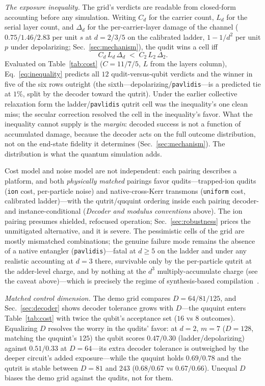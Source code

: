 \documentclass[aps,pra,reprint,superscriptaddress,nofootinbib,floatfix]{revtex4-2}
\begin{document}
\emph{The exposure inequality.} The grid's verdicts are readable from
closed-form accounting before any simulation. Writing $C_d$ for the
carrier count, $L_d$ for the serial layer count, and $\Delta_d$ for
the per-carrier-layer damage of the channel ($0.75/1.46/2.83$ per unit
$s$ at $d=2/3/5$ on the calibrated ladder, $1-1/d^2$ per unit $p$
under depolarizing; Sec.~\ref{sec:mechanism}), the qudit wins a cell
iff
\begin{equation}
C_d\,L_d\,\Delta_d \;<\; C_2\,L_2\,\Delta_2 .
\label{eq:inequality}
\end{equation}
Evaluated on Table~\ref{tab:cost} ($C=11/7/5$, $L$ from the layers
column), Eq.~\eqref{eq:inequality} predicts all $12$
qudit-versus-qubit verdicts and the winner in five of the six rows
outright (the sixth---depolarizing/\texttt{pavlidis}---is a predicted
tie at $1\%$, split by the decoder toward the qutrit). Under the
earlier collective relaxation form the ladder/\texttt{pavlidis}
qutrit cell was the inequality's one clean miss; the secular
correction resolved the cell in the inequality's favor. What the inequality cannot
supply is the \emph{margin}: decoded success is not a function of
accumulated damage, because the decoder acts on the full outcome
distribution, not on the end-state fidelity it determines
(Sec.~\ref{sec:mechanism}). The distribution is what the quantum
simulation adds.

Cost model and noise model are not independent: each pairing describes a
platform, and both \emph{physically matched} pairings favor
qudits---trapped-ion qudits (\texttt{ion} cost, per-particle noise)
and native-cross-Kerr transmons (\texttt{uniform} cost, calibrated
ladder)---with the qutrit/ququint ordering inside each pairing
decoder- and instance-conditional (\emph{Decoder and modulus
conventions} above). The ion pairing presumes shielded, refocused operation;
Sec.~\ref{sec:robustness} prices the unmitigated alternative, and it
is severe. The pessimistic cells of the grid are mostly mismatched
combinations; the genuine failure mode remains the absence of a native
entangler (\texttt{pavlidis})---fatal at $d\ge5$ on the ladder and
under any realistic accounting at $d=3$ there, survivable only by the
per-particle qutrit at the adder-level charge, and by nothing at the
$d^3$ multiply-accumulate charge (see the caveat above)---which is
precisely the regime of
synthesis-based compilation~\cite{gustafson2025synthesis,venturelli2025}.

\emph{Matched control dimension.} The demo grid compares
$D=64/81/125$, and Sec.~\ref{sec:decoder} shows decoder tolerance
grows with $D$---the ququint enters Table~\ref{tab:cost} with twice
the qubit's acceptance set ($16$ vs $8$ outcomes). Equalizing $D$
resolves the worry in the qudits' favor: at $d=2$, $m=7$ ($D=128$,
matching the ququint's $125$) the qubit scores $0.47/0.30$
(ladder/depolarizing) against $0.51/0.33$ at $D=64$---its extra
decoder tolerance is outweighed by the deeper circuit's added
exposure---while the ququint holds $0.69/0.78$ and the qutrit is
stable between $D=81$ and $243$ ($0.68/0.67$ vs $0.67/0.66$).
Unequal $D$ biases the demo grid against the qudits, not for them.
\end{document}
